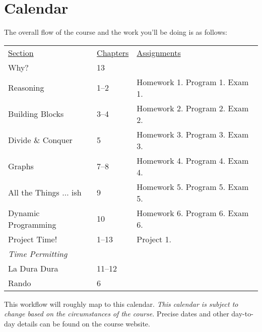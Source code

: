 \documentclass[10pt]{article}
\begin{document}
\section{Calendar}

The overall flow of the course and the work you'll be doing is as follows:
\begin{center}
\begin{tabular}{lll}
\underline{Section} & \underline{Chapters} & \underline{Assignments} \\
Why? &  13 & \\
Reasoning &  1--2 & Homework 1. Program 1. Exam 1. \\
Building Blocks &  3--4 & Homework 2. Program 2. Exam 2. \\
Divide \& Conquer & 5 & Homework 3. Program 3. Exam 3. \\
Graphs & 7--8 & Homework 4. Program 4. Exam 4. \\
All the Things $\ldots$ ish & 9 & Homework 5. Program 5. Exam 5. \\
Dynamic Programming & 10 & Homework 6. Program 6. Exam 6. \\
Project Time! & 1--13 & Project 1. \\
\textit{Time Permitting} & & \\
La Dura Dura & 11--12 &   \\
Rando & 6 &
\end{tabular}
\end{center}

This workflow will roughly map to this calendar. \textit{This calendar is subject to change based on the circumstances of the course.} Precise dates and other day-to-day details can be found on the course website.
\end{document}
